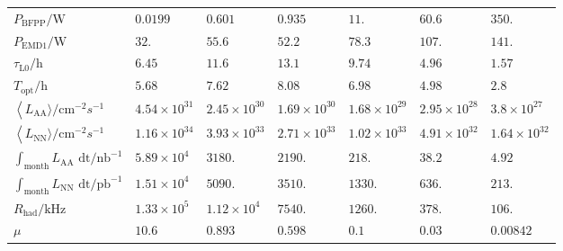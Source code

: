\begin{tabular}{|*{1}{*{7}{|l}|}|}
$P_{\text{BFPP}}\text{/W}$                                                     &    \(0.0199\) & \(0.601\) & \(0.935\) & \(11.\) & \(60.6\) & \(350.\) \\
$P_{\text{EMD1}}\text{/W}$                                                     &    \(32.\) & \(55.6\) & \(52.2\) & \(78.3\) & \(107.\) & \(141.\) \\
$\tau _{\text{L0}}\text{/h}$                                                   &    \(6.45\) & \(11.6\) & \(13.1\) & \(9.74\) & \(4.96\) & \(1.57\) \\
$T_{\text{opt}}\text{/h}$                                                      &    \(5.68\) & \(7.62\) & \(8.08\) & \(6.98\) & \(4.98\) & \(2.8\) \\
$\left\langle L_{\text{AA}}\text{$\rangle $/}\text{cm}^{-2}s^{-1}\right.$      &    \(4.54\times 10^{31}\) & \(2.45\times 10^{30}\) & \(1.69\times 10^{30}\) & \(1.68\times 10^{29}\) & \(2.95\times 10^{28}\) & \(3.8\times 10^{27}\) \\
$\left\langle L_{\text{NN}}\text{$\rangle $/}\text{cm}^{-2}s^{-1}\right.$      &    \(1.16\times 10^{34}\) & \(3.93\times 10^{33}\) & \(2.71\times 10^{33}\) & \(1.02\times 10^{33}\) & \(4.91\times 10^{32}\) & \(1.64\times 10^{32}\) \\
$\int _{\text{month}}L_{\text{AA}}\text{ dt/}\text{nb}^{-1}$                   &    \(5.89\times 10^4\) & \(3180.\) & \(2190.\) & \(218.\) & \(38.2\) & \(4.92\) \\
$\int _{\text{month}}L_{\text{NN}}\text{ dt/}\text{pb}^{-1}$                   &    \(1.51\times 10^4\) & \(5090.\) & \(3510.\) & \(1330.\) & \(636.\) &\(213.\) \\
$R_{\text{had}}\text{/kHz}$                                                    &    \(1.33\times 10^5\) & \(1.12\times 10^4\) & \(7540.\) & \(1260.\) & \(378.\) & \(106.\) \\
$\mu$                                                                          &    \(10.6\) & \(0.893\) & \(0.598\) & \(0.1\) & \(0.03\) & \(0.00842\) \\
\end{tabular}
